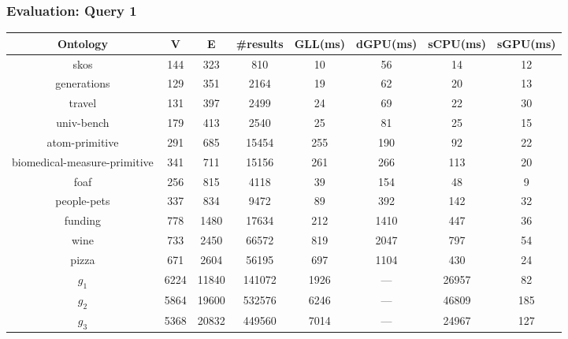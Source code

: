\documentclass[xcolor=table]{beamer}
\begin{document}
\begin{frame}
  \transwipe[direction=90]
  \frametitle{Evaluation: Query 1}         
\begin{tabular}{ | c | c | c | c | c | c | c | c |}
\hline
Ontology & V & E & \#results & GLL(ms) & dGPU(ms) & sCPU(ms) & sGPU(ms)\\
\hline 
\hline
skos        & 144 & 323 & 810 & 10 & 56 & 14 & 12\\
generations & 129 & 351 & 2164 & 19 & 62 & 20 & 13\\
travel      & 131 & 397 & 2499 & 24 & 69 & 22 & 30\\
univ-bench  & 179 & 413 & 2540 & 25 & 81 & 25 & 15\\
atom-primitive & 291 & 685 & 15454 & 255 & 190 & 92 & 22\\
biomedical-measure-primitive & 341 & 711 & 15156 & 261 & 266 & 113 & 20\\
foaf        & 256 & 815 & 4118 & 39 & 154 & 48 & 9\\
people-pets & 337 & 834 & 9472 & 89 & 392 & 142 & 32\\
funding     & 778 & 1480 & 17634 & 212 & 1410 & 447 & 36\\
wine        & 733 & 2450 & 66572 & 819 & 2047 & 797 & 54\\
pizza       & 671 & 2604 & 56195 & 697 & 1104 & 430 & 24\\
$g_{1}$     & 6224 & 11840 & 141072 & 1926 & --- & 26957 & 82\\
$g_{2}$     & 5864 & 19600 & 532576 & 6246 & --- & 46809 & 185\\
$g_{3}$     & 5368 & 20832 & 449560 & 7014 & --- & 24967 & 127\\
\hline
\end{tabular}
    \end{frame}     
\end{document}
